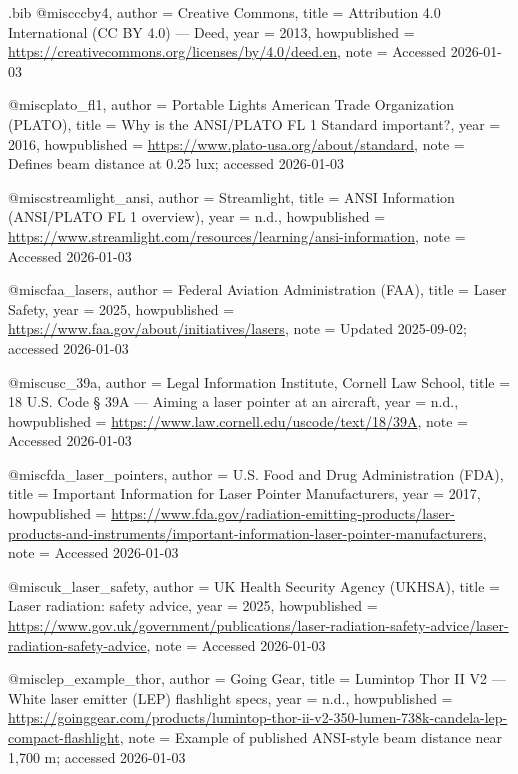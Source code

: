 \begin{filecontents*}{\jobname.bib}
@misc{ccby4,
  author       = {{Creative Commons}},
  title        = {Attribution 4.0 International (CC BY 4.0) --- Deed},
  year         = {2013},
  howpublished = {\url{https://creativecommons.org/licenses/by/4.0/deed.en}},
  note         = {Accessed 2026-01-03}
}

@misc{plato_fl1,
  author       = {{Portable Lights American Trade Organization (PLATO)}},
  title        = {Why is the ANSI/PLATO FL 1 Standard important?},
  year         = {2016},
  howpublished = {\url{https://www.plato-usa.org/about/standard}},
  note         = {Defines beam distance at 0.25 lux; accessed 2026-01-03}
}

@misc{streamlight_ansi,
  author       = {{Streamlight}},
  title        = {ANSI Information (ANSI/PLATO FL 1 overview)},
  year         = {n.d.},
  howpublished = {\url{https://www.streamlight.com/resources/learning/ansi-information}},
  note         = {Accessed 2026-01-03}
}

@misc{faa_lasers,
  author       = {{Federal Aviation Administration (FAA)}},
  title        = {Laser Safety},
  year         = {2025},
  howpublished = {\url{https://www.faa.gov/about/initiatives/lasers}},
  note         = {Updated 2025-09-02; accessed 2026-01-03}
}

@misc{usc_39a,
  author       = {{Legal Information Institute, Cornell Law School}},
  title        = {18 U.S. Code § 39A --- Aiming a laser pointer at an aircraft},
  year         = {n.d.},
  howpublished = {\url{https://www.law.cornell.edu/uscode/text/18/39A}},
  note         = {Accessed 2026-01-03}
}

@misc{fda_laser_pointers,
  author       = {{U.S. Food and Drug Administration (FDA)}},
  title        = {Important Information for Laser Pointer Manufacturers},
  year         = {2017},
  howpublished = {\url{https://www.fda.gov/radiation-emitting-products/laser-products-and-instruments/important-information-laser-pointer-manufacturers}},
  note         = {Accessed 2026-01-03}
}

@misc{uk_laser_safety,
  author       = {{UK Health Security Agency (UKHSA)}},
  title        = {Laser radiation: safety advice},
  year         = {2025},
  howpublished = {\url{https://www.gov.uk/government/publications/laser-radiation-safety-advice/laser-radiation-safety-advice}},
  note         = {Accessed 2026-01-03}
}

@misc{lep_example_thor,
  author       = {{Going Gear}},
  title        = {Lumintop Thor II V2 --- White laser emitter (LEP) flashlight specs},
  year         = {n.d.},
  howpublished = {\url{https://goinggear.com/products/lumintop-thor-ii-v2-350-lumen-738k-candela-lep-compact-flashlight}},
  note         = {Example of published ANSI-style beam distance near 1,700 m; accessed 2026-01-03}
}


\end{filecontents*}
